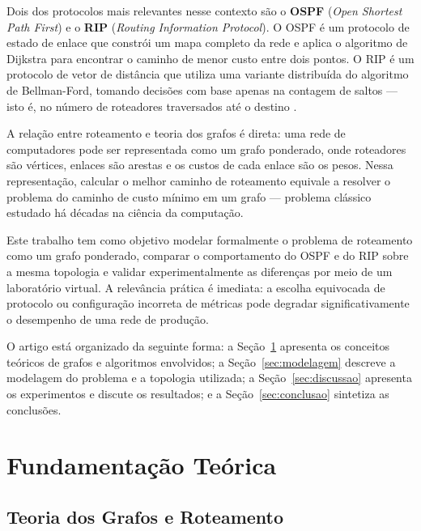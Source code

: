 \documentclass[12pt]{article}
\begin{document}
Dois dos protocolos mais relevantes nesse contexto são o \textbf{OSPF}
(\textit{Open Shortest Path First}) e o \textbf{RIP} (\textit{Routing Information
Protocol}). O OSPF é um protocolo de estado de enlace que constrói um mapa completo
da rede e aplica o algoritmo de Dijkstra para encontrar o caminho de menor custo
entre dois pontos. O RIP é um protocolo de vetor de distância que utiliza uma
variante distribuída do algoritmo de Bellman-Ford, tomando decisões com base apenas
na contagem de saltos — isto é, no número de roteadores traversados até o destino
\cite{rfc2328, rfc2453}.

A relação entre roteamento e teoria dos grafos é direta: uma rede de computadores
pode ser representada como um grafo ponderado, onde roteadores são vértices, enlaces
são arestas e os custos de cada enlace são os pesos. Nessa representação, calcular o
melhor caminho de roteamento equivale a resolver o problema do caminho de custo
mínimo em um grafo — problema clássico estudado há décadas na ciência da
computação.

Este trabalho tem como objetivo modelar formalmente o problema de roteamento como
um grafo ponderado, comparar o comportamento do OSPF e do RIP sobre a mesma
topologia e validar experimentalmente as diferenças por meio de um laboratório
virtual. A relevância prática é imediata: a escolha equivocada de protocolo ou
configuração incorreta de métricas pode degradar significativamente o desempenho de
uma rede de produção.

O artigo está organizado da seguinte forma: a Seção~\ref{sec:fundamentacao}
apresenta os conceitos teóricos de grafos e algoritmos envolvidos; a
Seção~\ref{sec:modelagem} descreve a modelagem do problema e a topologia utilizada;
a Seção~\ref{sec:discussao} apresenta os experimentos e discute os resultados; e a
Seção~\ref{sec:conclusao} sintetiza as conclusões.

\section{Fundamentação Teórica}
\label{sec:fundamentacao}

\subsection{Teoria dos Grafos e Roteamento}
\end{document}
